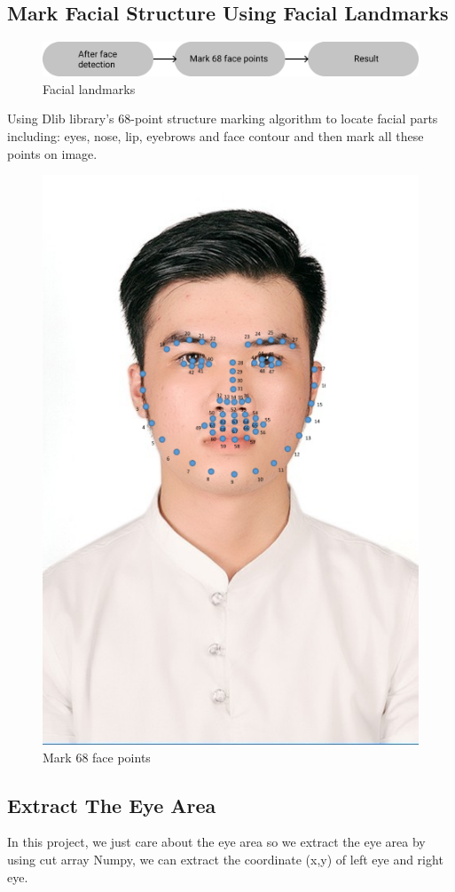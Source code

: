     \subsection{Mark Facial Structure Using Facial Landmarks}
        \begin{figure}[H]
            \centering
            \includegraphics[width=0.6\linewidth]{img/Figma.png}
            \caption{Facial landmarks}
        \end{figure}
        Using Dlib library's 68-point structure marking algorithm to locate facial parts including: eyes, nose, lip, eyebrows and face contour and 
        then mark all these points on image.
        \begin{figure}[H]
            \centering
            \includegraphics[width=0.6\linewidth]{img/testing.png}
            \caption{Mark 68 face points}
        \end{figure}

    \subsection{Extract The Eye Area}
        In this project, we just care about the eye area so we extract the eye area by using cut array Numpy, we can extract the coordinate (x,y) 
        of left eye and right eye.

